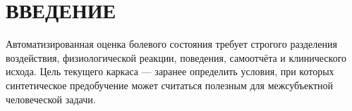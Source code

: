 \chapter*{ВВЕДЕНИЕ}

Автоматизированная оценка болевого состояния требует строгого разделения воздействия,
физиологической реакции, поведения, самоотчёта и клинического исхода. Цель текущего
каркаса --- заранее определить условия, при которых синтетическое предобучение может
считаться полезным для межсубъектной человеческой задачи.

